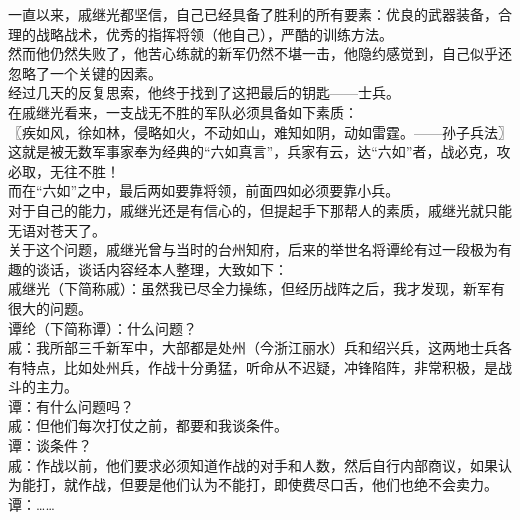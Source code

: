\begin{multicols}{\theparacolNo}
一直以来，戚继光都坚信，自己已经具备了胜利的所有要素：优良的武器装备，合理的战略战术，优秀的指挥将领（他自己），严酷的训练方法。\\

然而他仍然失败了，他苦心练就的新军仍然不堪一击，他隐约感觉到，自己似乎还忽略了一个关键的因素。\\

经过几天的反复思索，他终于找到了这把最后的钥匙——士兵。\\

在戚继光看来，一支战无不胜的军队必须具备如下素质：\\

〖疾如风，徐如林，侵略如火，不动如山，难知如阴，动如雷霆。——孙子兵法〗\\

这就是被无数军事家奉为经典的“六如真言”，兵家有云，达“六如”者，战必克，攻必取，无往不胜！\\

而在“六如”之中，最后两如要靠将领，前面四如必须要靠小兵。\\

对于自己的能力，戚继光还是有信心的，但提起手下那帮人的素质，戚继光就只能无语对苍天了。\\

关于这个问题，戚继光曾与当时的台州知府，后来的举世名将谭纶有过一段极为有趣的谈话，谈话内容经本人整理，大致如下：\\

戚继光（下简称戚）：虽然我已尽全力操练，但经历战阵之后，我才发现，新军有很大的问题。\\

谭纶（下简称谭）：什么问题？\\

戚：我所部三千新军中，大部都是处州（今浙江丽水）兵和绍兴兵，这两地士兵各有特点，比如处州兵，作战十分勇猛，听命从不迟疑，冲锋陷阵，非常积极，是战斗的主力。\\

谭：有什么问题吗？\\

戚：但他们每次打仗之前，都要和我谈条件。\\

谭：谈条件？\\

戚：作战以前，他们要求必须知道作战的对手和人数，然后自行内部商议，如果认为能打，就作战，但要是他们认为不能打，即使费尽口舌，他们也绝不会卖力。\\

谭：……\\


\end{multicols}
